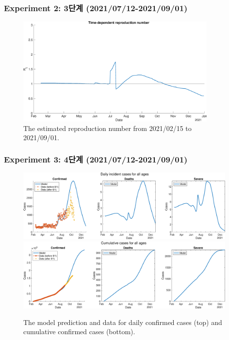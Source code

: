 \documentclass[aspectratio=169, 9pt, xcolor=dvipsnames]{beamer}
\begin{document}
	\begin{frame}\frametitle{Experiment 2: 3단계 (2021/07/12-2021/09/01)}
	    \begin{figure}
	    	\centering
	    	\includegraphics[width=10cm]{../results/predict_exp_2_sd3_same_school_same/rep_num.eps}
	    	\caption{The estimated reproduction number from 2021/02/15 to 2021/09/01.}
	    \end{figure}
	\end{frame}

	\begin{frame}\frametitle{Experiment 3: 4단계 (2021/07/12-2021/09/01)}
	    \begin{figure}
	    	\centering
	    	\includegraphics[width=11cm]{../results/predict_exp_3_sd3_same_school_same/daily_all_age.eps}
	    	\includegraphics[width=11cm]{../results/predict_exp_3_sd3_same_school_same/cumul_all_age.eps}
	    	\caption{The model prediction and data for daily confirmed cases (top) and cumulative confirmed cases (bottom).}
	    \end{figure}
	\end{frame}
\end{document}
